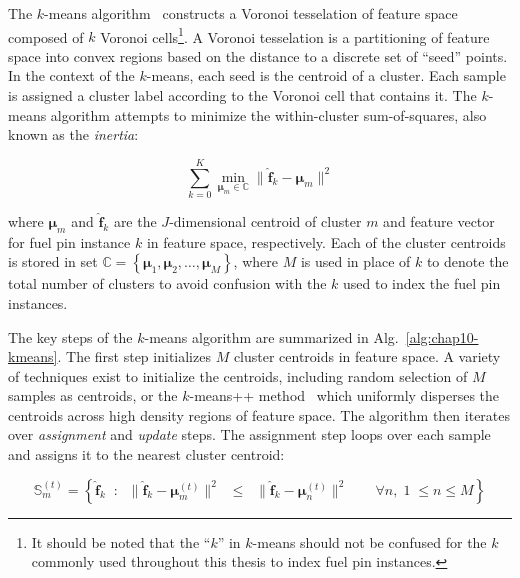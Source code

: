 The $k$-means algorithm~\cite{macqueen1967kmeans, lloyd1982kmeans} constructs a Voronoi tesselation of feature space composed of $k$ Voronoi cells\footnote{It should be noted that the ``$k$'' in $k$-means should not be confused for the $k$ commonly used throughout this thesis to index fuel pin instances.}. A Voronoi tesselation is a partitioning of feature space into convex regions based on the distance to a discrete set of ``seed'' points. In the context of the $k$-means, each seed is the centroid of a cluster. Each sample is assigned a cluster label according to the Voronoi cell that contains it. The $k$-means algorithm attempts to minimize the within-cluster sum-of-squares, also known as the \textit{inertia}:

\begin{equation}
\label{eqn:chap10-kmeans-inertia}
\displaystyle\sum\limits_{k=0}^{K} \min_{\boldsymbol{\mu}_{m} \in \mathbb{C}} \|\boldsymbol{\hat{f}}_{k} - \boldsymbol{\mu}_{m}\|^{2}
\end{equation}

\noindent where $\boldsymbol{\mu}_{m}$ and $\boldsymbol{\hat{f}}_{k}$ are the $J$-dimensional centroid of cluster $m$ and feature vector for fuel pin instance $k$ in feature space, respectively. Each of the cluster centroids is stored in set $\mathbb{C} = \left\{ \boldsymbol{\mu}_{1}, \boldsymbol{\mu}_{2}, \dots, \boldsymbol{\mu}_{M} \right\}$, where $M$ is used in place of $k$ to denote the total number of clusters to avoid confusion with the $k$ used to index the fuel pin instances.

The key steps of the $k$-means algorithm are summarized in Alg.~\ref{alg:chap10-kmeans}. The first step initializes $M$ cluster centroids in feature space. A variety of techniques exist to initialize the centroids, including random selection of $M$ samples as centroids, or the $k$-means++ method~\cite{arthur2007kmeans++} which uniformly disperses the centroids across high density regions of feature space. The algorithm then iterates over \textit{assignment} and \textit{update} steps. The assignment step loops over each sample and assigns it to the nearest cluster centroid:

\begin{equation}
\label{eqn:chap10-kmeans-assign}
\mathbb{S}_{m}^{(t)} = \left\{ \boldsymbol{\hat{f}}_{k} \;\; : \;\; \| \boldsymbol{\hat{f}}_{k} - \boldsymbol{\mu}_{m}^{(t)} \|^{2} \;\; \le \;\; \| \boldsymbol{\hat{f}}_{k} - \boldsymbol{\mu}_{n}^{(t)} \|^{2} \;\;\;\;\;\;\; \forall n, \; 1 \; \le n \le M \right\}
\end{equation}

